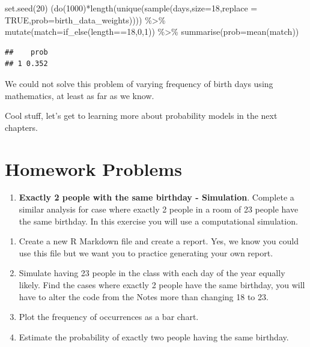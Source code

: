 \documentclass[
]{book}
\newenvironment{Shaded}{\begin{snugshade}}{\end{snugshade}}
\newcommand{\AttributeTok}[1]{\textcolor[rgb]{0.77,0.63,0.00}{#1}}
\newcommand{\ConstantTok}[1]{\textcolor[rgb]{0.00,0.00,0.00}{#1}}
\newcommand{\DecValTok}[1]{\textcolor[rgb]{0.00,0.00,0.81}{#1}}
\newcommand{\FunctionTok}[1]{\textcolor[rgb]{0.00,0.00,0.00}{#1}}
\newcommand{\NormalTok}[1]{#1}
\newcommand{\SpecialCharTok}[1]{\textcolor[rgb]{0.00,0.00,0.00}{#1}}
\providecommand{\tightlist}{%
  \setlength{\itemsep}{0pt}\setlength{\parskip}{0pt}}
\begin{document}
\begin{Shaded}
\begin{Highlighting}[]
\FunctionTok{set.seed}\NormalTok{(}\DecValTok{20}\NormalTok{)}
\NormalTok{(}\FunctionTok{do}\NormalTok{(}\DecValTok{1000}\NormalTok{)}\SpecialCharTok{*}\FunctionTok{length}\NormalTok{(}\FunctionTok{unique}\NormalTok{(}\FunctionTok{sample}\NormalTok{(days,}\AttributeTok{size=}\DecValTok{18}\NormalTok{,}\AttributeTok{replace =} \ConstantTok{TRUE}\NormalTok{,}\AttributeTok{prob=}\NormalTok{birth\_data\_weights)))) }\SpecialCharTok{\%\textgreater{}\%}
  \FunctionTok{mutate}\NormalTok{(}\AttributeTok{match=}\FunctionTok{if\_else}\NormalTok{(length}\SpecialCharTok{==}\DecValTok{18}\NormalTok{,}\DecValTok{0}\NormalTok{,}\DecValTok{1}\NormalTok{)) }\SpecialCharTok{\%\textgreater{}\%}
  \FunctionTok{summarise}\NormalTok{(}\AttributeTok{prob=}\FunctionTok{mean}\NormalTok{(match))}
\end{Highlighting}
\end{Shaded}

\begin{verbatim}
##    prob
## 1 0.352
\end{verbatim}

We could not solve this problem of varying frequency of birth days using mathematics, at least as far as we know.

Cool stuff, let's get to learning more about probability models in the next chapters.

\hypertarget{homework-problems-6}{%
\section{Homework Problems}\label{homework-problems-6}}

\begin{enumerate}
\def\labelenumi{\arabic{enumi}.}
\tightlist
\item
  \textbf{Exactly 2 people with the same birthday - Simulation}. Complete a similar analysis for case where exactly 2 people in a room of 23 people have the same birthday. In this exercise you will use a computational simulation.
\end{enumerate}

\begin{enumerate}
\def\labelenumi{\alph{enumi}.}
\tightlist
\item
  Create a new R Markdown file and create a report. Yes, we know you could use this file but we want you to practice generating your own report.\\
\item
  Simulate having 23 people in the class with each day of the year equally likely. Find the cases where exactly 2 people have the same birthday, you will have to alter the code from the Notes more than changing 18 to 23.\\
\item
  Plot the frequency of occurrences as a bar chart.\\
\item
  Estimate the probability of exactly two people having the same birthday.
\end{enumerate}
\end{document}
